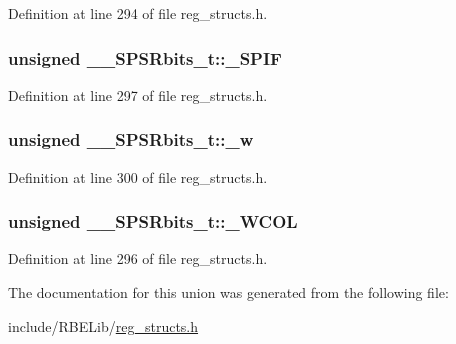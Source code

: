 Definition at line 294 of file reg\+\_\+structs.\+h.

\hypertarget{union_____s_p_s_rbits__t_a9a5003c1b452c02f565efacedae8cb80}{
\subsubsection[{\+\_\+\+S\+P\+I\+F}]{\setlength{\rightskip}{0pt plus 5cm}unsigned \+\_\+\+\_\+\+S\+P\+S\+Rbits\+\_\+t\+::\+\_\+\+S\+P\+I\+F}}\label{union_____s_p_s_rbits__t_a9a5003c1b452c02f565efacedae8cb80}


Definition at line 297 of file reg\+\_\+structs.\+h.

\hypertarget{union_____s_p_s_rbits__t_aa379e60332583517d9e5a20af8980590}{
\subsubsection[{\+\_\+w}]{\setlength{\rightskip}{0pt plus 5cm}unsigned \+\_\+\+\_\+\+S\+P\+S\+Rbits\+\_\+t\+::\+\_\+w}}\label{union_____s_p_s_rbits__t_aa379e60332583517d9e5a20af8980590}


Definition at line 300 of file reg\+\_\+structs.\+h.

\hypertarget{union_____s_p_s_rbits__t_ab82ac5db76de0e95351ec9b405834383}{
\subsubsection[{\+\_\+\+W\+C\+O\+L}]{\setlength{\rightskip}{0pt plus 5cm}unsigned \+\_\+\+\_\+\+S\+P\+S\+Rbits\+\_\+t\+::\+\_\+\+W\+C\+O\+L}}\label{union_____s_p_s_rbits__t_ab82ac5db76de0e95351ec9b405834383}


Definition at line 296 of file reg\+\_\+structs.\+h.



The documentation for this union was generated from the following file\+:\begin{DoxyCompactItemize}
\item 
include/\+R\+B\+E\+Lib/\hyperlink{reg__structs_8h}{reg\+\_\+structs.\+h}\end{DoxyCompactItemize}
